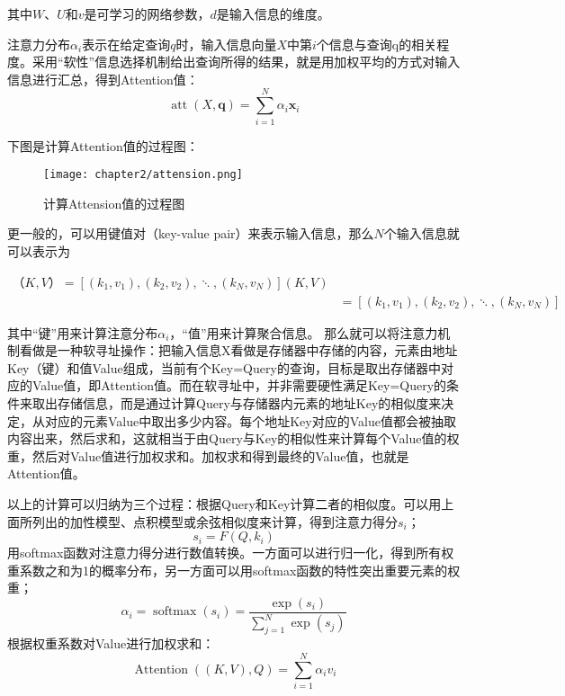 其中$W$、$U$和$v$是可学习的网络参数，$d$是输入信息的维度。

注意力分布$\alpha _i$表示在给定查询$q$时，输入信息向量$X$中第$i$个信息与查询q的相关程度。采用“软性”信息选择机制给出查询所得的结果，就是用加权平均的方式对输入信息进行汇总，得到Attention值：
\begin{equation}
    \operatorname{att}(X, \mathbf{q})=\sum_{i=1}^N \alpha_i \mathbf{x}_i
    \end{equation}

下图是计算Attention值的过程图：
\begin{figure}[ht]
    \centering
    \texttt{[image: chapter2/attension.png]}
    \caption{计算Attension值的过程图}
    \end{figure}

更一般的，可以用键值对（key-value pair）来表示输入信息，那么$N$个输入信息就可以表示为

\begin{equation}
	\begin{aligned}	
    （K, V）= [(k_1,v_1),(k_2,v_2),\ddots,(k_N,v_N)](K, V) \\
    &= [(k_1,v_1),(k_2,v_2),\ddots,(k_N,v_N)]
	\end{aligned}
\end{equation}

其中“键”用来计算注意分布$\alpha _i$，“值”用来计算聚合信息。
那么就可以将注意力机制看做是一种软寻址操作：把输入信息X看做是存储器中存储的内容，元素由地址Key（键）和值Value组成，当前有个Key=Query的查询，目标是取出存储器中对应的Value值，即Attention值。而在软寻址中，并非需要硬性满足Key=Query的条件来取出存储信息，而是通过计算Query与存储器内元素的地址Key的相似度来决定，从对应的元素Value中取出多少内容。每个地址Key对应的Value值都会被抽取内容出来，然后求和，这就相当于由Query与Key的相似性来计算每个Value值的权重，然后对Value值进行加权求和。加权求和得到最终的Value值，也就是Attention值。

以上的计算可以归纳为三个过程：根据Query和Key计算二者的相似度。可以用上面所列出的加性模型、点积模型或余弦相似度来计算，得到注意力得分$s_i$；
\begin{equation}
    s_i=F\left(Q, k_i\right)
    \end{equation}
用softmax函数对注意力得分进行数值转换。一方面可以进行归一化，得到所有权重系数之和为1的概率分布，另一方面可以用softmax函数的特性突出重要元素的权重；
\begin{equation}
    \alpha_i=\operatorname{softmax}\left(s_i\right)=\frac{\exp \left(s_i\right)}{\sum_{j=1}^N \exp \left(s_j\right)}
    \end{equation}
根据权重系数对Value进行加权求和：
\begin{equation}
    \operatorname{Attention}((K, V), Q)=\sum_{i=1}^N \alpha_i v_i
    \end{equation}

